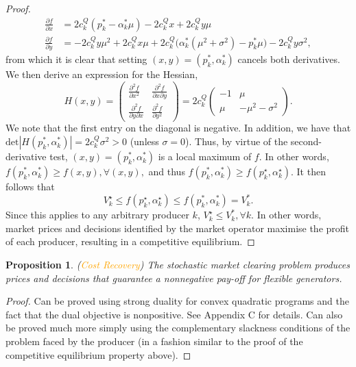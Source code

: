 \documentclass{article}
\newtheorem{proposition}{Proposition}
\begin{document}
\begin{proof}
\begin{align*}
\frac{\partial f}{\partial x} &= 2c_k^Q(p_k^* - \alpha_k^*\mu) - 2 c_k^Q x + 2c_k^Q y \mu\\
\frac{\partial f}{\partial y} &= - 2c_k^Q y \mu^2 + 2 c_k^Q x \mu + 2c_k^Q\big(\alpha_k^*(\mu^2 + \sigma^2) - p_k^* \mu\big) - 2c_k^Q y \sigma^2,
\end{align*}
from which it is clear that setting $(x, y) = (p_k^*, \alpha_k^*)$ cancels both derivatives. We then derive an expression for the Hessian,
\begin{equation*}
H(x,y) = \begin{pmatrix} \frac{\partial^2 f}{\partial x^2} & \frac{\partial^2 f}{\partial x \partial y} \\ \frac{\partial^2 f}{\partial y \partial x} & \frac{\partial^2 f}{\partial y^2} \end{pmatrix} = 2c_k^Q \begin{pmatrix} -1 & \mu \\ \mu & -\mu^2 - \sigma^2 \end{pmatrix}.
\end{equation*}
We note that the first entry on the diagonal is negative. In addition, we have that $\mbox{det}|H(p_k^*, \alpha_k^*)| = 2 c_k^Q \sigma^2 > 0$ (unless $\sigma = 0$). Thus, by virtue of the second-derivative test, $(x, y) = (p_k^*, \alpha_k^*)$ is a local maximum of $f$. In other words, $f(p_k^*, \alpha_k^*) \ge f(x, y), \forall (x, y),$ and thus $f(p_k^*, \alpha_k^*) \ge f(p_k^\star, \alpha_k^\star)$. It then follows that
\begin{equation*}
V_k^\star \le f(p_k^\star, \alpha_k^\star) \le f(p_k^*, \alpha_k^*) = V_k^*.
\end{equation*}
Since this applies to any arbitrary producer $k$, $V_k^\star \le V_k^*, \forall k$. In other words, market prices and decisions identified by the market operator maximise the profit of each producer, resulting in a competitive equilibrium.
\end{proof}

\begin{proposition}
(\textcolor{orange}{Cost Recovery}) The stochastic market clearing problem produces prices and decisions that guarantee a nonnegative pay-off for flexible generators.
\end{proposition}
\begin{proof}
Can be proved using strong duality for convex quadratic programs and the fact that the dual objective is nonpositive. See Appendix C for details. Can also be proved much more simply using the complementary slackness conditions of the problem faced by the producer (in a fashion similar to the proof of the competitive equilibrium property above). 
\end{proof}
\end{document}
